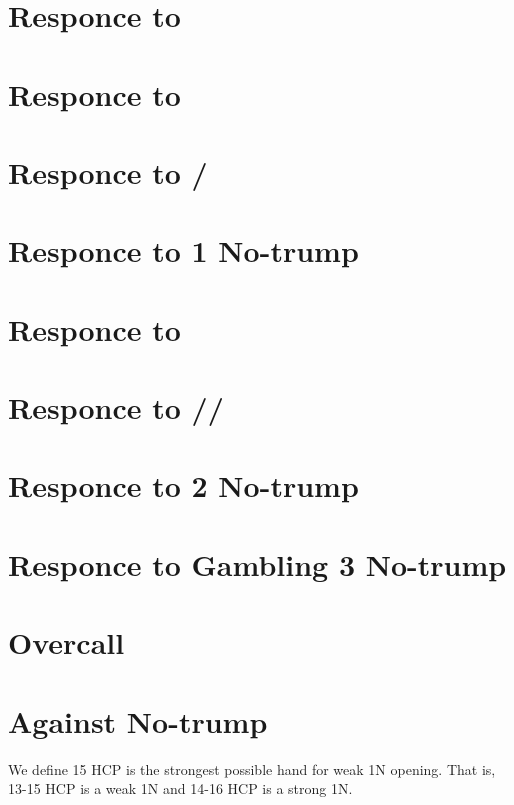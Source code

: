 \documentclass[12pt,twoside,a5paper]{report}%
\begin{document}
\chapter*{Responce to }
\chapter*{Responce to }
\chapter*{Responce to /\sp{}}
\chapter*{Responce to 1 No-trump}
\chapter*{Responce to }
\chapter*{Responce to /\he{}/\sp{}}
\chapter*{Responce to 2 No-trump}
\chapter*{Responce to Gambling 3 No-trump}
\chapter*{Overcall}
\chapter*{Against No-trump}
	We define 15 HCP is the strongest possible hand for weak 1N opening. That is, 13-15 HCP is a weak 1N and 14-16 HCP is a strong 1N. 
\end{document}

